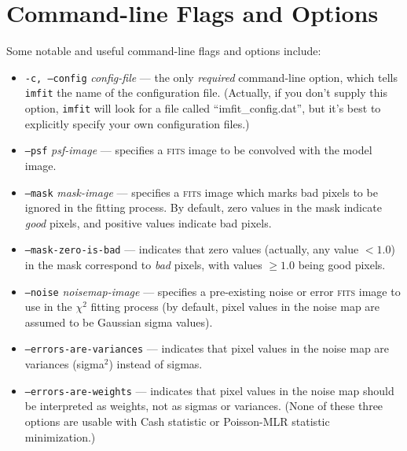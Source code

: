 \documentclass[10pt,a4paper,article]{memoir}
\newcommand{\imfitprog}{\texttt{imfit}}
\newcommand{\chisquare}{\ensuremath{\chi^{2}}}
\begin{document}
\section{Command-line Flags and Options}\label{sec:imfit-flags}

Some notable and useful command-line flags and options include:
\begin{itemize}
\item \texttt{-c, --config} \textit{config-file} --- the only \textit{required}
command-line option, which tells \imfitprog{} the name of the configuration file.
(Actually, if you don't supply this option, \imfitprog{} will look for a file
called ``imfit\_config.dat'', but it's best to explicitly specify your own
configuration files.)

\bigskip

\item \texttt{--psf} \textit{psf-image} --- specifies a \textsc{fits} image to be convolved
with the model image.

\bigskip

\item \texttt{--mask} \textit{mask-image} --- specifies a \textsc{fits} image which marks
bad pixels to be ignored in the fitting process. By default, zero values in
the mask indicate \textit{good} pixels, and positive values indicate bad pixels.
\item \texttt{--mask-zero-is-bad} --- indicates that zero values (actually,
any value $< 1.0$) in the mask correspond to \textit{bad} pixels, with values
$\geq 1.0$ being good pixels.

\bigskip

\item \texttt{--noise} \textit{noisemap-image} --- specifies a pre-existing noise
or error \textsc{fits} image to use in the \chisquare{} fitting process (by default, pixel values in the
noise map are assumed to be Gaussian sigma values).
\item \texttt{--errors-are-variances} --- indicates that pixel values in the noise
map are variances (sigma$^2$) instead of sigmas.
\item \texttt{--errors-are-weights} --- indicates that pixel values in the noise
map should be interpreted as weights, not as sigmas or variances. (None
of these three options are usable with Cash statistic or Poisson-MLR statistic minimization.)

\bigskip


\end{itemize}
\end{document}
